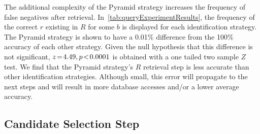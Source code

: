 
The additional complexity of the Pyramid strategy increases the frequency of false negatives after retrieval.
In~\autoref{tab:queryExperimentResults}, the frequency of the correct $r$ existing in $R$ for some $b$ is displayed
for each identification strategy.
The Pyramid strategy is shown to have a 0.01\% difference from the 100\% accuracy of each other strategy.
Given the null hypothesis that this difference is not significant, $z \!=\! 4.49, p\!<\!0.0001$ is obtained with a
one tailed two sample $Z$ test.
We find that the Pyramid strategy's $R$ retrieval step is less accurate than other identification strategies.
Although small, this error will propagate to the next steps and will result in more database accesses and/or a lower
average accuracy.

\subsection{Candidate Selection Step}\label{subsec:candidateSelectionStep}
\begin{figure}
\end{figure}

